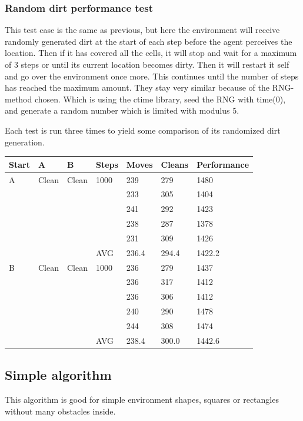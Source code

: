 \subsubsection{Random dirt performance test}
This test case is the same as previous, but here the environment will receive
randomly generated dirt at the start of each step before the agent perceives the
location.  Then if it has covered all the cells, it will stop and wait for
a maximum of 3 steps or until its current location becomes dirty. Then it will
restart it self and go over the environment once more. This continues until the
number of steps has reached the maximum amount.  They stay very similar because
of the RNG-method chosen. Which is using the ctime library, seed the RNG with
time(0), and generate a random number which is limited with modulus 5.

Each test is run three times to yield some comparison of its randomized dirt
generation.

\begin{longtable}{p{} p{} p{} 
									p{} p{} p{} 
									p{}}
Start	& A & B & Steps & Moves & Cleans & Performance \\\hline
A & Clean & Clean & 1000 
		 & 239 & 279 & 1480 \\
	&&&& 233 & 305 & 1404 \\
	&&&& 241 & 292 & 1423 \\
	&&&& 238 & 287 & 1378 \\
	&&&& 231 & 309 & 1426 \\\hline
  &&& AVG & 236.4 & 294.4 & 1422.2\\\hline

B & Clean & Clean & 1000 
		 & 236 & 279 & 1437 \\
	&&&& 236 & 317 & 1412 \\
	&&&& 236 & 306 & 1412 \\
	&&&& 240 & 290 & 1478 \\
	&&&& 244 & 308 & 1474 \\\hline
  &&& AVG & 238.4 & 300.0 & 1442.6 \\\hline
\end{longtable}


\subsection{Simple algorithm}
	This algorithm is good for simple environment shapes, squares or rectangles without many obstacles inside.
	
